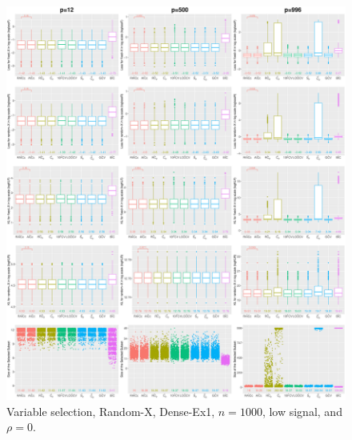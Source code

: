 \begin{figure}[!ht]
\centering
\includegraphics[width=\textwidth]{figures/supplement/randomx/subset_selection/Dense-Ex1_n1000_lsnr_rho0.eps}
\caption{Variable selection, Random-X, Dense-Ex1, $n=1000$, low signal, and $\rho=0$.}
\end{figure}
\clearpage
